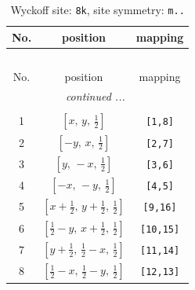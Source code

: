 \documentclass[fleqn,8pt]{jsarticle}
\begin{document}
\begin{longtable}{ccc}
\caption{Wyckoff site: {\tt 8k}, site symmetry: {\tt m..}}
 \\
 \hline \hline
No. & position & mapping \\ \hline \endfirsthead

\multicolumn{2}{l}{\tablename\ \thetable{}} \\
 \hline \hline
No. & position & mapping \\ \hline \endhead

 \hline \hline
\multicolumn{2}{r}{\footnotesize\it continued ...} \\ \endfoot

 \hline \hline
\multicolumn{2}{r}{} \\ \endlastfoot

1 & $\left[ x,\, y,\, \frac{1}{2} \right]$ & {\tt [1,8]} \\ \hline
2 & $\left[ - y,\, x,\, \frac{1}{2} \right]$ & {\tt [2,7]} \\ \hline
3 & $\left[ y,\, - x,\, \frac{1}{2} \right]$ & {\tt [3,6]} \\ \hline
4 & $\left[ - x,\, - y,\, \frac{1}{2} \right]$ & {\tt [4,5]} \\ \hline
5 & $\left[ x + \frac{1}{2},\, y + \frac{1}{2},\, \frac{1}{2} \right]$ & {\tt [9,16]} \\ \hline
6 & $\left[ \frac{1}{2} - y,\, x + \frac{1}{2},\, \frac{1}{2} \right]$ & {\tt [10,15]} \\ \hline
7 & $\left[ y + \frac{1}{2},\, \frac{1}{2} - x,\, \frac{1}{2} \right]$ & {\tt [11,14]} \\ \hline
8 & $\left[ \frac{1}{2} - x,\, \frac{1}{2} - y,\, \frac{1}{2} \right]$ & {\tt [12,13]} \\
\end{longtable}
\renewcommand{\arraystretch}{1.2}
\end{document}
